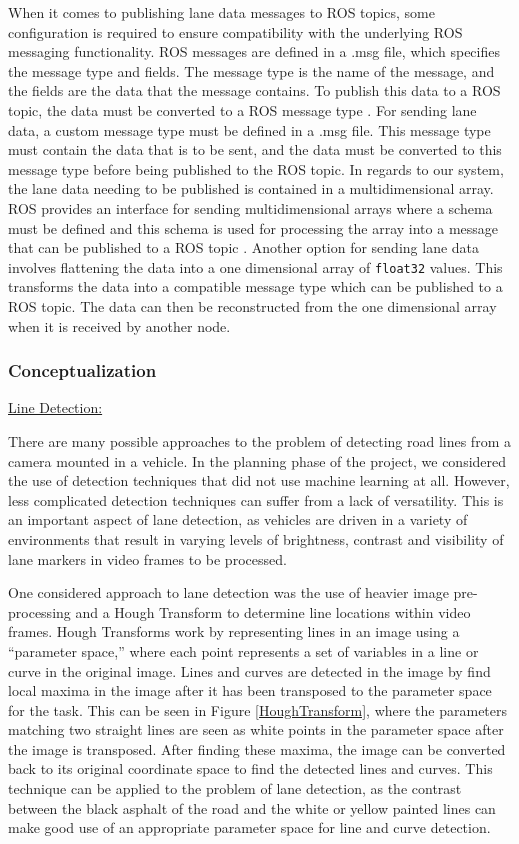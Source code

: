 \documentclass[titlepage,draft]{article}
\begin{document}
When it comes to publishing lane data messages to ROS topics, some configuration is required to ensure compatibility with the underlying ROS messaging functionality. ROS messages are defined in a .msg file, which specifies the message type and fields. The message type is the name of the message, and the fields are the data that the message contains. To publish this data to a ROS topic, the data must be converted to a ROS message type \cite{ros_documentation}. For sending lane data, a custom message type must be defined in a .msg file. This message type must contain the data that is to be sent, and the data must be converted to this message type before being published to the ROS topic. In regards to our system, the lane data needing to be published is contained in a multidimensional array. ROS provides an interface for sending multidimensional arrays where a schema must be defined and this schema is used for processing the array into a message that can be published to a ROS topic \cite{ros_multi_array}. Another option for sending lane data involves flattening the data into a one dimensional array of \texttt{float32} values. This transforms the data into a compatible message type which can be published to a ROS topic. The data can then be reconstructed from the one dimensional array when it is received by another node. 


\subsubsection{Conceptualization}
\label{DetConcept}

\underline{Line Detection:}

There are many possible approaches to the problem of detecting road lines from a camera mounted in a vehicle.
In the planning phase of the project, we considered the use of detection techniques that did not use machine learning at all.
However, less complicated detection techniques can suffer from a lack of versatility.
This is an important aspect of lane detection, as vehicles are driven in a variety of environments that result in varying
levels of brightness, contrast and visibility of lane markers in video frames to be processed.

One considered approach to lane detection was the use of heavier image pre-processing and a Hough Transform to determine line
locations within video frames.
Hough Transforms work by representing lines in an image using a ``parameter space,'' where each point represents a set of
variables in a line or curve in the original image.
Lines and curves are detected in the image by find local maxima in the image after it has been transposed to the parameter space
for the task.
This can be seen in Figure \ref{HoughTransform}, where the parameters matching two straight lines are seen as white points in
the parameter space after the image is transposed.
After finding these maxima, the image can be converted back to its original coordinate space to find the detected lines and
curves.
This technique can be applied to the problem of lane detection, as the contrast between the black asphalt of the road and the
white or yellow painted lines can make good use of an appropriate parameter space for line and curve detection.
\end{document}
